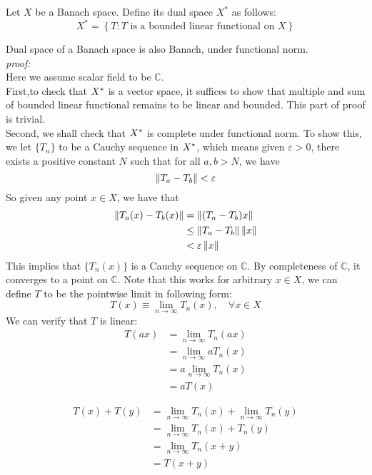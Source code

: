 \begin{definition}\rm\nextline
	Let $X$ be a Banach space. Define its dual space $X^*$ as follows:
	$$
		X^*=\left\{
		T: T\text{ is a bounded linear functional on } X
		\right\}
	$$
\end{definition}
\begin{proposition}\label{dual space Banach}\rm\nextline
	Dual space of a Banach space is also Banach, under functional norm.\\
	\textit{proof:}\\
	Here we assume scalar field to be $\mathbb{C}$.\\
	First,to check that ${X}^*$ is a vector space, it suffices to show that multiple and sum of bounded linear functional remains to be linear and bounded. This part of proof is trivial.\\
	Second, we shall check that ${X}^*$ is complete under functional norm.
	To show this, we let $\{T_n\}$ to be a Cauchy sequence in ${X}^*$, which means given $\varepsilon>0$, there exists a positive constant $N$ such that for all $a,b>N$, we have
	$$
		\left\|{T_a-T_b}\right\|<\varepsilon
	$$
	So given any point $x\in X$, we have that
	\begin{equation}
		\begin{split}
			\left\|{T_a(x)-T_b(x)}\right\|&=\left\|{(T_a-T_b)x}\right\|\\
			&\leq \left\|{T_a-T_b}\right\|\left\|{x}\right\|\\
			&<\varepsilon\left\|{x}\right\|
		\end{split}
	\end{equation}
	This implies that $\{T_n(x)\}$ is a Cauchy sequence on $\mathbb{C}$. By completeness of $\mathbb{C}$, it converges to a point on $\mathbb{C}$. Note that this works for arbitrary $x\in X$, we can define $T$ to be the pointwise limit in following form:
	$$
		T(x)\equiv\lim_{n\to\infty}{T_n(x)},\quad\forall x\in X
	$$
	We can verify that $T$ is linear:
	\begin{equation}
		\begin{split}
			T(ax)&=\lim_{n\to\infty}{T_n(ax)}\\
			&=\lim_{n\to\infty}{aT_n(x)}\\
			&=a\lim_{n\to\infty}{T_n(x)}\\
			&=aT(x)
		\end{split}
	\end{equation}

	\begin{equation}
		\begin{split}
			T(x)+T(y)&=\lim_{n\to\infty}{T_n(x)}+\lim_{n\to\infty}{T_n(y)} \\
			&=\lim_{n\to\infty}{T_n(x)+T_n(y)}\\
			&=\lim_{n\to\infty}{T_n(x+y)}\\
			&=T(x+y)
		\end{split}
	\end{equation}


\end{proposition}
